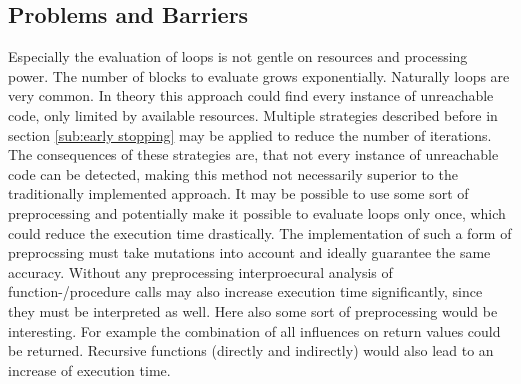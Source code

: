 \subsection{Problems and Barriers}
\label{sub:problems and barriers}
Especially the evaluation of loops is not gentle on resources and processing power. The number of blocks to evaluate grows exponentially. Naturally loops are very common. In theory this approach could find every instance of unreachable code, only limited by available resources. Multiple strategies described before in section \ref{sub:early stopping} may be applied to reduce the number of iterations.
The consequences of these strategies are, that not every instance of unreachable code can be detected, making this method not necessarily superior to the traditionally implemented approach.
It may be possible to use some sort of preprocessing and potentially make it possible to evaluate loops only once, which could reduce the execution time drastically.
The implementation of such a form of preprocssing must take mutations into account and ideally guarantee the same accuracy.
Without any preprocessing interproecural analysis of function-/procedure calls may also increase execution time significantly, since they must be interpreted as well. Here also some sort of preprocessing would be interesting. For example the combination of all influences on return values could be returned. 
Recursive functions (directly and indirectly) would also lead to an increase of execution time.
